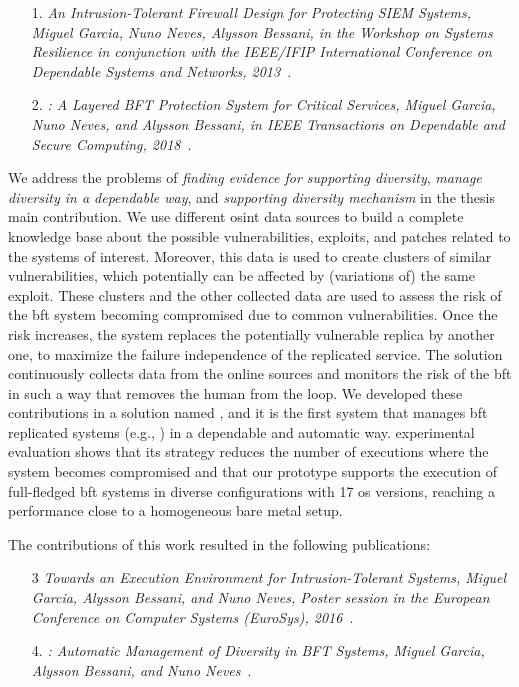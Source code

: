 \begin{enumerate}
\item[1.] \emph{An Intrusion-Tolerant Firewall Design for Protecting SIEM Systems, Miguel Garcia, Nuno Neves, Alysson Bessani, in the Workshop on Systems Resilience in conjunction with the IEEE/IFIP International Conference on Dependable Systems and Networks, 2013}~\cite{Garcia:2013}.

\item[2.] \emph{\sieveq: A Layered BFT Protection System for Critical Services, Miguel Garcia, Nuno Neves, and Alysson Bessani, in IEEE Transactions on Dependable and Secure Computing, 2018}~\cite{Garcia:2016}.
\end{enumerate}


We address the problems of \emph{finding evidence for supporting diversity}, \emph{manage diversity in a dependable way}, and \emph{supporting diversity mechanism} in the thesis main contribution.
We use different \gls{osint} data sources to build a complete knowledge base about the possible vulnerabilities, exploits, and patches related to the systems of interest. 
Moreover, this data is used to create clusters of similar vulnerabilities, which potentially can be affected by (variations of) the same exploit. 
These clusters and the other collected data are used to assess the risk of the \gls{bft} system becoming compromised due to common vulnerabilities.
Once the risk increases, the system replaces the potentially vulnerable replica by another one, to maximize the failure independence of the replicated service.
The solution continuously collects data from the online sources and monitors the risk of the \gls{bft} in such a way that removes the human from the loop.
We developed these contributions in a solution named \system, and it is the first system that manages \gls{bft} replicated systems (e.g., \sieveq) in a dependable and automatic way.
\system experimental evaluation shows that its strategy reduces the number of executions where the system becomes compromised and that our prototype supports the execution of full-fledged \gls{bft} systems in diverse configurations with 17 \gls{os} versions, reaching a performance close to a homogeneous bare metal setup. 


The contributions of this work resulted in the following publications:

\begin{enumerate}

\item[3] \emph{Towards an Execution Environment for Intrusion-Tolerant Systems, Miguel Garcia, Alysson Bessani, and Nuno Neves, Poster session in the European Conference on Computer Systems (EuroSys), 2016}~\cite{Garcia:2016b}.


\item[4.] \emph{\system: Automatic Management of Diversity in BFT Systems, Miguel Garcia, Alysson Bessani, and Nuno Neves}~\cite{}.

\end{enumerate}


